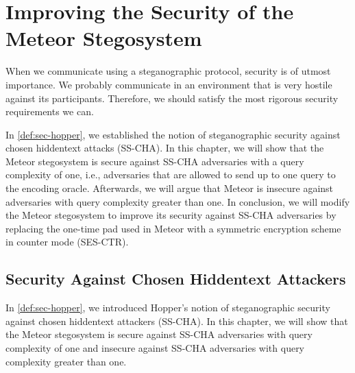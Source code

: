 \chapter{Improving the Security of the Meteor Stegosystem}
\label{chap:security}

When we communicate using a steganographic protocol, security is of utmost importance.
We probably communicate in an environment that is very hostile against its participants.
Therefore, we should satisfy the most rigorous security requirements we can.

In \autoref{def:sec-hopper}, we established the notion of steganographic security against chosen hiddentext attacks (SS-CHA).
In this chapter, we will show that the Meteor stegosystem is secure against SS-CHA adversaries with a query complexity of one, i.e., adversaries that are allowed to send up to one query to the encoding oracle.
Afterwards, we will argue that Meteor is insecure against adversaries with query complexity greater than one.
In conclusion, we will modify the Meteor stegosystem to improve its security against SS-CHA adversaries by replacing the one-time pad used in Meteor with a symmetric encryption scheme in counter mode (SES-CTR).

\section{Security Against Chosen Hiddentext Attackers}

In \autoref{def:sec-hopper}, we introduced Hopper's notion of steganographic security against chosen hiddentext attackers (SS-CHA).
In this chapter, we will show that the Meteor stegosystem is secure against SS-CHA adversaries with query complexity of one and insecure against SS-CHA adversaries with query complexity greater than one.



